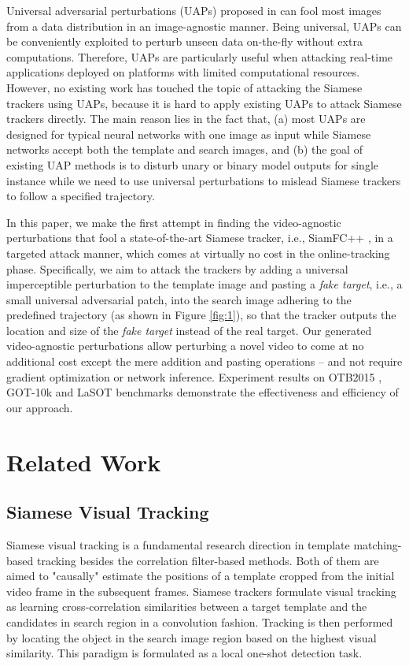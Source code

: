 \documentclass[journal]{IEEEtran}
\newcommand{\ie}{i.e.}
\begin{document}
Universal adversarial perturbations (UAPs) proposed in \cite{UAP} can fool most images from a data distribution in an image-agnostic manner. Being universal, UAPs can be conveniently exploited to perturb unseen data on-the-fly without extra computations. Therefore, UAPs are particularly useful when attacking real-time applications deployed on platforms with limited computational resources. However, no existing work has touched the topic of attacking the Siamese trackers using UAPs, because it is hard to apply existing UAPs to attack Siamese trackers directly. The main reason lies in the fact that, (a) most UAPs are designed for typical neural networks with one image as input while Siamese networks accept both the template and search images, and (b) the goal of existing UAP methods is to disturb unary or binary model outputs for single instance while we need to use universal perturbations to mislead Siamese trackers to follow a specified trajectory.
  
In this paper, we make the first attempt in finding the video-agnostic perturbations that fool a state-of-the-art Siamese tracker, \ie, SiamFC++ \cite{SiamFC++}, in a targeted attack manner, which comes at virtually no cost in the online-tracking phase. Specifically, we aim to attack the trackers by adding a universal imperceptible perturbation to the template image and pasting a \textit{fake target}, \ie, a small universal adversarial patch, into the search image adhering to the predefined trajectory (as shown in Figure \ref{fig:1}), so that the tracker outputs the location and size of the \textit{fake target} instead of the real target. Our generated video-agnostic perturbations allow perturbing a novel video to come at no additional cost except the mere addition and pasting operations -- and not require gradient optimization or network inference. Experiment results on OTB2015 \cite{OTB}, GOT-10k \cite{GOT-10k} and LaSOT \cite{GOT-10k} benchmarks demonstrate the effectiveness and efficiency of our approach.

\section{Related Work}

\subsection{Siamese Visual Tracking}

Siamese visual tracking is a fundamental research direction in template matching-based tracking besides the correlation filter-based methods. Both of them are aimed to "causally" estimate the positions of a template cropped from the initial video frame in the subsequent frames. Siamese trackers formulate visual tracking as learning cross-correlation similarities between a target template and the candidates in search region in a convolution fashion. Tracking is then performed by locating the object in the search image region based on the highest visual similarity. This paradigm is formulated as a local one-shot detection task.
\end{document}
